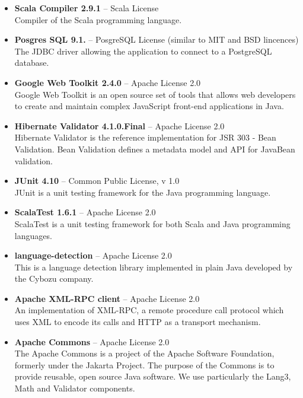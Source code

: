 \begin{itemize}
\item {\bf Scala Compiler 2.9.1} -- Scala License \\
Compiler of the Scala programming language.
\item {\bf Posgres SQL 9.1.} -- PosgreSQL License (similar to MIT and BSD lincences) \\
The JDBC driver allowing the application to connect to a PostgreSQL database.
\item {\bf Google Web Toolkit 2.4.0} -- Apache License 2.0 \\
Google Web Toolkit is an open source set of tools that allows web developers to create and maintain complex JavaScript front-end applications in Java.

\item {\bf Hibernate Validator 4.1.0.Final} -- Apache License 2.0 \\
Hibernate Validator is the reference implementation for JSR 303 - Bean Validation. Bean Validation defines a metadata model and API for JavaBean validation.

\item {\bf JUnit 4.10} -- Common Public License, v 1.0 \\
JUnit is a unit testing framework for the Java programming language.

\item {\bf ScalaTest 1.6.1} -- Apache License 2.0 \\
ScalaTest is a unit testing framework for both Scala and Java programming languages.

\item {\bf language-detection} -- Apache License 2.0 \\
This is a language detection library implemented in plain Java developed by the Cybozu company.

\item {\bf Apache XML-RPC client} -- Apache License 2.0  \\
An implementation of XML-RPC, a remote procedure call protocol which uses XML to encode its calls and HTTP as a transport mechanism.

\item {\bf Apache Commons} -- Apache License 2.0 \\
The Apache Commons is a project of the Apache Software Foundation, formerly under the Jakarta Project. The purpose of the Commons is to provide reusable, open source Java software. We use particularly the Lang3, Math and Validator components.


\end{itemize}
